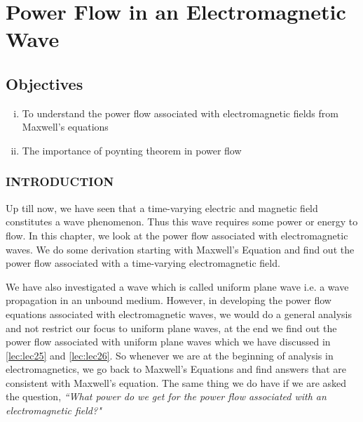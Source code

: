 \chapter{Power Flow in an Electromagnetic Wave}\label{lec:lec27}
\begin{mdframed}[backgroundcolor=lightblue, linewidth=1pt,  hidealllines=true]
\section{Objectives}
\begin{enumerate}[(i)]
	\item To understand the power flow associated with electromagnetic fields from Maxwell's equations
	\item The importance of poynting theorem in power flow
\end{enumerate}
\end{mdframed}
	\subsection{INTRODUCTION}
Up till now, we have seen that a time-varying electric and magnetic field constitutes a wave phenomenon. Thus this wave requires some power or energy to flow. In this chapter, we look at the power flow associated with electromagnetic waves. We do some derivation starting with Maxwell's Equation and find out the power flow associated with a time-varying electromagnetic field.

 We have also investigated a wave which is called uniform plane wave i.e. a wave propagation in an unbound medium. However, in developing the power flow equations associated with electromagnetic waves, we would do a general analysis and not restrict our focus to uniform plane waves, at the end we find out the power flow associated with uniform plane waves which we have discussed in \autoref{lec:lec25} and \autoref{lec:lec26}. So whenever we are at the beginning of analysis in electromagnetics, we go back to Maxwell's Equations and find answers that are consistent with Maxwell's equation. The same thing we do have if we are asked the question,  \emph{``What power do we get for the power flow associated with an electromagnetic field?"}

